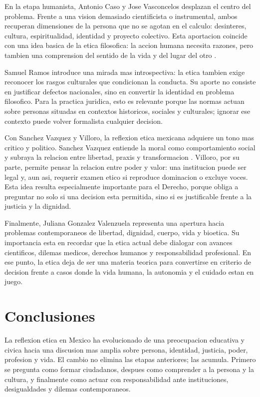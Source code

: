 \documentclass[
	spanish,
	letterpaper, oneside
]{article}
\begin{document}
En la etapa humanista, Antonio Caso y Jose Vasconcelos desplazan el centro del problema. Frente a una vision demasiado cientificista o instrumental, ambos recuperan dimensiones de la persona que no se agotan en el calculo: desinteres, cultura, espiritualidad, identidad y proyecto colectivo. Esta aportacion coincide con una idea basica de la etica filosofica: la accion humana necesita razones, pero tambien una comprension del sentido de la vida y del lugar del otro \citep{huertaEticaConClasicos2000,singerCompendioEtica1995}.

Samuel Ramos introduce una mirada mas introspectiva: la etica tambien exige reconocer los rasgos culturales que condicionan la conducta. Su aporte no consiste en justificar defectos nacionales, sino en convertir la identidad en problema filosofico. Para la practica juridica, esto es relevante porque las normas actuan sobre personas situadas en contextos historicos, sociales y culturales; ignorar ese contexto puede volver formalista cualquier decision.

Con Sanchez Vazquez y Villoro, la reflexion etica mexicana adquiere un tono mas critico y politico. Sanchez Vazquez entiende la moral como comportamiento social y subraya la relacion entre libertad, praxis y transformacion \citep{sanchezVazquezEtica1969}. Villoro, por su parte, permite pensar la relacion entre poder y valor: una institucion puede ser legal y, aun asi, requerir examen etico si reproduce dominacion o excluye voces. Esta idea resulta especialmente importante para el Derecho, porque obliga a preguntar no solo si una decision esta permitida, sino si es justificable frente a la justicia y la dignidad.

Finalmente, Juliana Gonzalez Valenzuela representa una apertura hacia problemas contemporaneos de libertad, dignidad, cuerpo, vida y bioetica. Su importancia esta en recordar que la etica actual debe dialogar con avances cientificos, dilemas medicos, derechos humanos y responsabilidad profesional. En ese punto, la etica deja de ser una materia teorica para convertirse en criterio de decision frente a casos donde la vida humana, la autonomia y el cuidado estan en juego.

\section{Conclusiones}

La reflexion etica en Mexico ha evolucionado de una preocupacion educativa y civica hacia una discusion mas amplia sobre persona, identidad, justicia, poder, profesion y vida. El cambio no elimina las etapas anteriores; las acumula. Primero se pregunta como formar ciudadanos, despues como comprender a la persona y la cultura, y finalmente como actuar con responsabilidad ante instituciones, desigualdades y dilemas contemporaneos.
\end{document}

